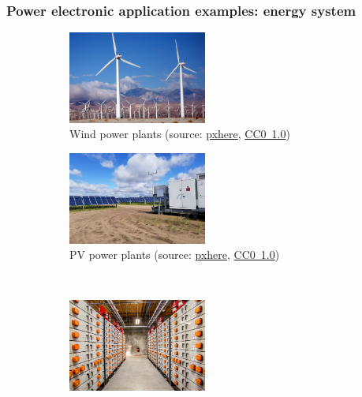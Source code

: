 \begin{frame}[c]
	\frametitle{Power electronic application examples: energy system}
	\begin{figure}
		\centering
		\begin{subfigure}[b]{0.49\textwidth}
			\centering
			\includegraphics[width=0.5\textwidth]{fig/lec01/sky-farm-windmill.jpg}
			\caption{Wind power plants (source: \href{https://pxhere.com/en/photo/954757}{pxhere}, \href{https://creativecommons.org/publicdomain/zero/1.0/}{CC0~1.0})}
		\end{subfigure}
		\hfill
		\begin{subfigure}[b]{0.49\textwidth}
			\centering
			\includegraphics[width=0.5\textwidth]{fig/lec01/PV_field.jpg}
			\caption{PV power plants (source: \href{https://pxhere.com/en/photo/1685464}{pxhere}, \href{https://creativecommons.org/publicdomain/zero/1.0/}{CC0~1.0})}
		\end{subfigure}
		\\
		\begin{subfigure}[b]{0.49\textwidth}
			\centering
			\includegraphics[width=0.5\textwidth]{fig/lec01/Battery_storage.jpg}

\end{subfigure}
\end{figure}
\end{frame}
